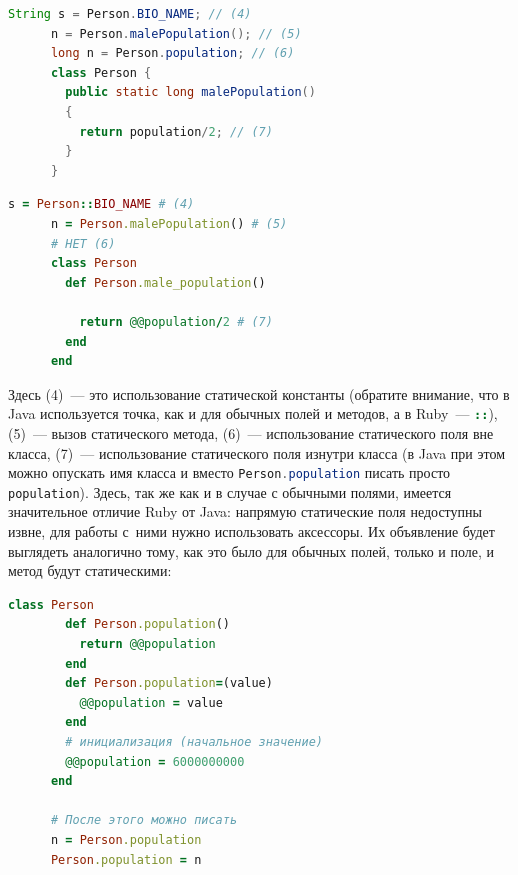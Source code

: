\documentclass[a4paper, 14pt, titlepage]{extarticle}
\newenvironment{halfpage}%
    {\noindent\begin{minipage}[h]{0.49\linewidth}} %
    {\end{minipage}\hfill}
\newcommand{\inlinecode}[2][Java]{\lstinline[basicstyle=\ttfamily, language=#1]{#2}}
\begin{document}
  \begin{halfpage}
    \begin{lstlisting}[language=Java, title={Использование static'ов в Java}, gobble=6, texcl]
      String s = Person.BIO_NAME; // (4)
      n = Person.malePopulation(); // (5)
      long n = Person.population; // (6)
      class Person {
        public static long malePopulation()
        {
          return population/2; // (7)
        }
      }
    \end{lstlisting}
  \end{halfpage}
  \begin{halfpage}
    \begin{lstlisting}[language=Ruby, title={Использование static'ов в Ruby}, gobble=6, texcl]
      s = Person::BIO_NAME # (4)
      n = Person.malePopulation() # (5)
      # НЕТ (6)
      class Person
        def Person.male_population()

          return @@population/2 # (7)
        end
      end
    \end{lstlisting}
  \end{halfpage}

  Здесь (4)~--- это использование статической константы (обратите внимание, что в Java используется
  точка, как и для обычных полей и методов, а в Ruby~--- \inlinecode[Ruby]{::}), (5)~--- вызов
  статического метода, (6)~--- использование статического поля вне класса, (7)~--- использование
  статического поля изнутри класса (в Java при этом можно опускать имя класса и вместо
  \inlinecode{Person.population} писать просто \inlinecode{population}). Здесь, так же как и в
  случае с обычными полями, имеется значительное отличие Ruby от Java: напрямую статические поля
  недоступны извне, для работы с~ними нужно использовать аксессоры. Их объявление будет выглядеть
  аналогично тому, как это было для обычных полей, только и поле, и метод будут статическими:

  \begin{center}
  \begin{halfpage}
    \begin{lstlisting}[language=Ruby, title={Статические аксессоры в Ruby}, gobble=6, texcl]
      class Person
        def Person.population()
          return @@population
        end
        def Person.population=(value)
          @@population = value
        end
        # инициализация (начальное значение)
        @@population = 6000000000
      end

      # После этого можно писать
      n = Person.population
      Person.population = n
    \end{lstlisting}
  \end{halfpage}
  \end{center}
\end{document}
